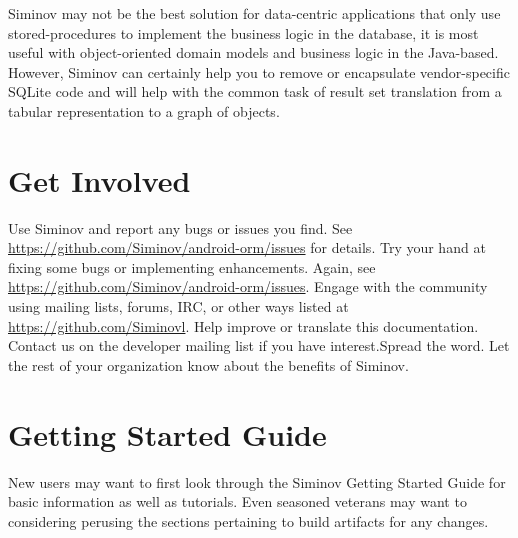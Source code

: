 Siminov may not be the best solution for data-centric applications that only use stored-procedures to implement the business logic in the database, it is most useful with object-oriented domain models and business logic in the Java-based. However, Siminov can certainly help you to remove or encapsulate vendor-specific SQLite code and will help with the common task of result set translation from a tabular representation to a graph of objects.


\section{Get Involved}

Use Siminov and report any bugs or issues you find. See \url{https://github.com/Siminov/android-orm/issues} for details. Try your hand at fixing some bugs or implementing enhancements. Again, see \url{https://github.com/Siminov/android-orm/issues}. Engage with the community using mailing lists, forums, IRC, or other ways listed at \url{https://github.com/Siminovl}. Help improve or translate this documentation. Contact us on the developer mailing list if you have interest.Spread the word. Let the rest of your organization know about the benefits of Siminov.


\section{Getting Started Guide}

New users may want to first look through the Siminov Getting Started Guide for basic information as well as tutorials. Even seasoned veterans may want to considering perusing the sections pertaining to build artifacts for any changes.
